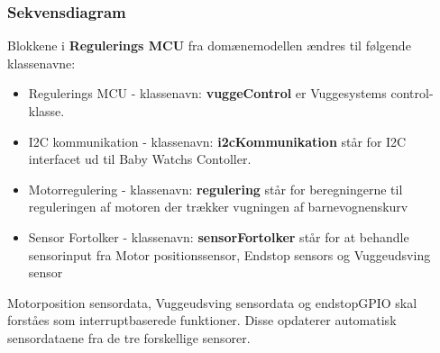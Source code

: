 \subsubsection*{Sekvensdiagram}
\label{Vuggesystem:SD} 


Blokkene i \textbf{Regulerings MCU} fra domænemodellen ændres til følgende klassenavne: \\
\begin{itemize}
\item Regulerings MCU - klassenavn: \textbf{vuggeControl} er Vuggesystems control-klasse. 
\item I2C kommunikation - klassenavn: \textbf{i2cKommunikation} står for I2C interfacet ud til Baby Watchs Contoller.
\item Motorregulering - klassenavn: \textbf{regulering} står for beregningerne til reguleringen af motoren der trækker vugningen af barnevognenskurv
\item Sensor Fortolker - klassenavn: \textbf{sensorFortolker} står for at behandle sensorinput fra Motor positionssensor, Endstop sensors og Vuggeudsving sensor
\end{itemize}

Motorposition sensordata, Vuggeudsving sensordata og endstopGPIO skal forståes som interruptbaserede funktioner. Disse opdaterer automatisk sensordataene fra de tre forskellige sensorer.